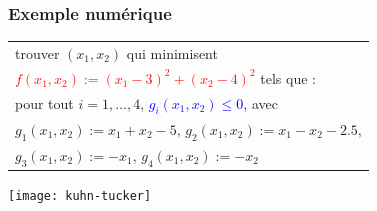\documentclass{beamer}
\begin{document}
\begin{frame}
  \frametitle{Exemple numérique}

  \begin{center}  
  \begin{tabular}{l}
    trouver $(x_1,x_2)$ qui minimisent \\
    \textcolor{red}{$f(x_1,x_2) := (x_1 - 3)^2 + (x_2 - 4)^2$} tels que : \\
    pour tout $i = 1, \dots, 4$, \textcolor{blue}{$g_i(x_1,x_2) \leq 0$}, avec \\
    $g_1(x_1,x_2) := x_1 + x_2 - 5$, $g_2(x_1,x_2) := x_1 - x_2 - 2.5$, \\
    $g_3(x_1,x_2) := -x_1$, $g_4(x_1,x_2) := -x_2$ 
  \end{tabular}
  \end{center}
  
  \begin{center}  
    \texttt{[image: kuhn-tucker]}
  \end{center}
\end{frame}
\end{document}
